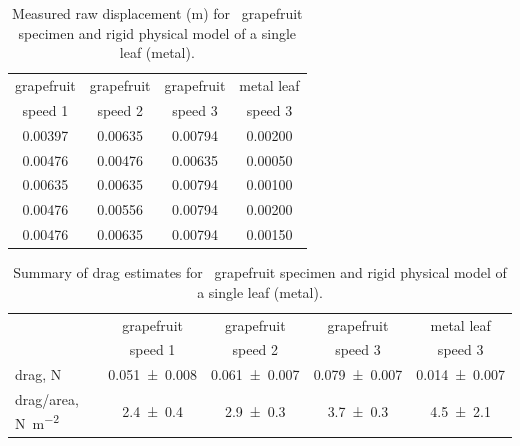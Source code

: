 \begin{table}
\caption{Measured raw displacement (\si{\meter}) for \Cxparadisi\ grapefruit specimen and rigid physical model of a single leaf (metal).}
\label{tab:results:displacement}
\begin{center}
\begin{tabular}{cccc}
\toprule
grapefruit & grapefruit & grapefruit & metal leaf \\
speed 1 & speed 2 & speed 3 & speed 3 \\ 
\midrule
0.00397 & 0.00635 & 0.00794 & 0.00200 \\ %
0.00476 & 0.00476 & 0.00635 & 0.00050 \\
0.00635 & 0.00635 & 0.00794 & 0.00100 \\
0.00476 & 0.00556 & 0.00794 & 0.00200 \\
0.00476 & 0.00635 & 0.00794 & 0.00150 \\
\bottomrule
\end{tabular}
\end{center}
\end{table}

\begin{table}
\caption{Summary of drag estimates for \Cxparadisi\ grapefruit specimen and rigid physical model of a single leaf (metal).}
\label{tab:results:drag}
\begin{center}
\begin{tabular}{lcccc}
\toprule
& grapefruit & grapefruit & grapefruit & metal leaf \\
& speed 1 & speed 2 & speed 3 & speed 3 \\
\midrule
drag, \si{\newton} & \num{0.051\pm0.008} & \num{0.061\pm0.007} & \num{0.079\pm0.007} & \num{0.014\pm0.007} \\
drag/area, \si{\newton\per\meter\squared} & \num{2.4\pm0.4} & \num{2.9\pm0.3} & \num{3.7\pm0.3} & \num{4.5\pm2.1} \\
\bottomrule
\end{tabular}
\end{center}
\end{table}

